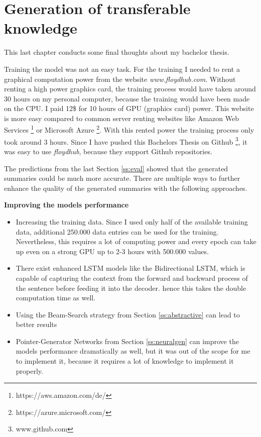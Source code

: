 \chapter{Generation of transferable knowledge}\label{ch:knowledge}

This last chapter conducts some final thoughts about my bachelor thesis.

Training the model was not an easy task. For the training I needed to rent a graphical computation power from the website \textit{www.floydhub.com}. Without renting a high power graphics card, the training process would have taken around 30 hours on my personal computer, because the training would have been made on the CPU. I paid 12\$ for 10 hours of GPU (graphics card) power. This website is more easy compared to common server renting websites like Amazon Web Services \footnote{https://aws.amazon.com/de/} or Microsoft Azure \footnote{https://azure.microsoft.com/}. With this rented power the training process only took around 3 hours. Since I have pushed this Bachelors Thesis on Github \footnote{www.github.com}, it was easy to use \textit{floydhub}, because they support Github repositories.

The predictions from the last Section \ref{ss:eval} showed that the generated summaries could be much more accurate. There are multiple ways to further enhance the quality of the generated summaries with the following approaches. 

\textbf{Improving the models performance} 

\begin{itemize}
	\item Increasing the training data. Since I used only half of the available training data, additional 250.000 data entries can be used for the training. Nevertheless, this requires a lot of computing power and every epoch can take up even on a strong GPU up to 2-3 hours with 500.000 values.
	\item There exist enhanced LSTM models like the Bidirectional LSTM, which is capable of capturing the context from the forward and backward process of the sentence before feeding it into the decoder. hence this takes the double computation time as well.
	\item Using the Beam-Search strategy from Section \ref{ss:abstractive} can lead to better results
	\item Pointer-Generator Networks from Section \ref{ss:neuralgen} can improve the models performance dramatically as well, but it was out of the scope for me to implement it, because it requires a lot of knowledge to implement it properly.
\end{itemize}


